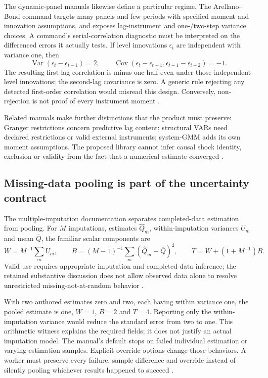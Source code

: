 The dynamic-panel manuals likewise define a particular regime. The
Arellano--Bond command targets many panels and few periods with specified
moment and innovation assumptions, and exposes lag-instrument and
one-/two-step variance choices. A command's serial-correlation diagnostic
must be interpreted on the differenced errors it actually tests. If level
innovations $\epsilon_t$ are independent with variance one, then
\[
 \operatorname{Var}(\epsilon_t-\epsilon_{t-1})=2,\qquad
 \operatorname{Cov}(\epsilon_t-\epsilon_{t-1},
                    \epsilon_{t-1}-\epsilon_{t-2})=-1.
\]
The resulting first-lag correlation is minus one half even under those
independent level innovations; the second-lag covariance is zero. A generic
rule rejecting any detected first-order correlation would misread this
design. Conversely, non-rejection is not proof of every instrument moment
\cite{exec19_dynamic_stata_ab,exec24_stata_choice}.

Related manuals make further distinctions that the product must preserve:
Granger restrictions concern predictive lag content; structural VARs need
declared restrictions or valid external instruments; system-GMM adds its
own moment assumptions. The proposed library cannot infer causal shock
identity, exclusion or validity from the fact that a numerical estimate
converged \cite{exec13_ct_stata_granger,exec13_ct_stata_svar,
exec13_ct_stata_ivsvar,exec19_dynamic_stata_system,exec24_stata_choice}.

\subsection{Missing-data pooling is part of the uncertainty contract}
The multiple-imputation documentation separates completed-data estimation
from pooling. For $M$ imputations, estimates $\widehat Q_m$, within-imputation
variances $U_m$ and mean $\overline Q$, the familiar scalar components are
\[
 W=M^{-1}\sum_m U_m,\qquad
 B=(M-1)^{-1}\sum_m(\widehat Q_m-\overline Q)^2,\qquad
 T=W+(1+M^{-1})B.
\]
Valid use requires appropriate imputation and completed-data inference;
the retained substantive discussion does not allow observed data alone to
resolve unrestricted missing-not-at-random behavior
\cite{exec21_transport_stata_estimate,exec21_transport_stata_substantive}.

With two authored estimates zero and two, each having within variance one,
the pooled estimate is one, $W=1$, $B=2$ and $T=4$. Reporting only the
within-imputation variance would reduce the standard error from two to
one. This arithmetic witness explains the required fields; it does not
justify an actual imputation model. The manual's default stops on failed
individual estimation or varying estimation samples. Explicit override
options change those behaviors. A worker must preserve every failure,
sample difference and override instead of silently pooling whichever
results happened to succeed \cite{exec21_transport_stata_estimate,
exec24_stata_choice}.

